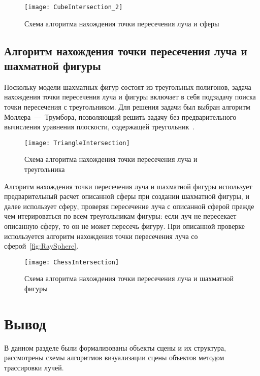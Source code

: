\begin{figure}[H]
	\centering
	\texttt{[image: CubeIntersection\_2]}
	\caption{Схема алгоритма нахождения точки пересечения луча и сферы}
	\label{fig:CubeIntersection_2}
\end{figure}

\subsection{Алгоритм нахождения точки пересечения луча и шахматной фигуры}
Поскольку модели шахматных фигур состоят из треугольных полигонов, задача нахождения точки пересечения луча и фигуры включает в себя подзадачу поиска точки пересечения с треугольником. Для решения задачи был выбран алгоритм Моллера~---~Трумбора, позволяющий решить задачу без предварительного вычисления уравнения плоскости, содержащей треугольник~\cite{lit8}.

\begin{figure}[H]
	\centering
	\texttt{[image: TriangleIntersection]}
	\caption{Схема алгоритма нахождения точки пересечения луча и треугольника}
	\label{fig:TriangleIntersection}
\end{figure}

Алгоритм нахождения точки пересечения луча и шахматной фигуры использует предварительный расчет описанной сферы при создании шахматной фигуры, и далее использует сферу, проверяя пересечение луча с описанной сферой прежде чем итерироваться по всем треугольникам фигуры: если луч не пересекает описанную сферу, то он не может пересечь фигуру. При описанной проверке используется алгоритм нахождения точки пересечения луча со сферой~\ref{fig:RaySphere}.

\begin{figure}[H]
	\centering
	\texttt{[image: ChessIntersection]}
	\caption{Схема алгоритма нахождения точки пересечения луча и шахматной фигуры}
	\label{fig:ChessIntersection}
\end{figure}

\section{Вывод}
В данном разделе были формализованы объекты сцены и их структура, рассмотрены схемы алгоритмов визуализации сцены объектов методом трассировки лучей.

\clearpage
